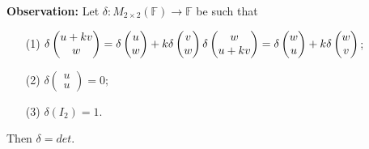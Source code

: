 \documentclass[12pt]{article}
\begin{document}
\noindent\textbf{Observation:} Let $\delta : M_{2 \times 2}(\mathbb{F}) \to \mathbb{F}$ be such that
\begin{itemize}
    \item[(1)] 
    $\delta \begin{pmatrix}
    u + kv \\ w
    \end{pmatrix} = \delta \begin{pmatrix}
    u \\ w
    \end{pmatrix} + k\delta \begin{pmatrix}
    v \\ w
    \end{pmatrix} \\ 
    \delta \begin{pmatrix}
    w \\ u + kv
    \end{pmatrix} = \delta \begin{pmatrix}
    w \\ u
    \end{pmatrix} + k\delta \begin{pmatrix}
    w \\ v
    \end{pmatrix}$;

    \item[(2)] $\delta \begin{pmatrix}
    u \\ u
    \end{pmatrix} = 0;$
    
    \item[(3)] $\delta(I_2) = 1$.
\end{itemize} Then $\delta = det$.

\vspace{1em}
\end{document}
